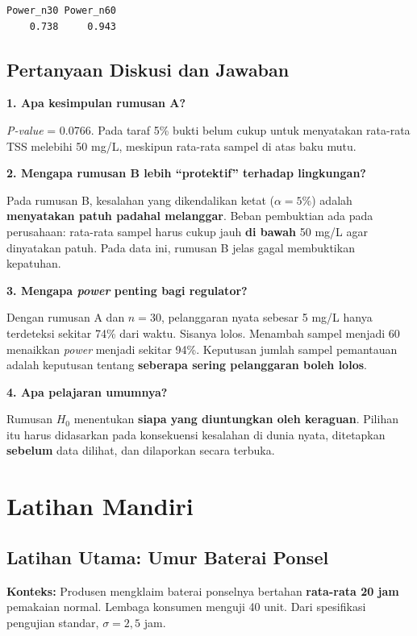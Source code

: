 \documentclass[
  indonesian,
  letterpaper,
]{book}
\begin{document}
\begin{verbatim}
Power_n30 Power_n60 
    0.738     0.943 
\end{verbatim}

\subsection{Pertanyaan Diskusi dan
Jawaban}\label{pertanyaan-diskusi-dan-jawaban-1}

\textbf{1. Apa kesimpulan rumusan A?}

\emph{P-value} = 0.0766. Pada taraf 5\% bukti belum cukup untuk
menyatakan rata-rata TSS melebihi 50 mg/L, meskipun rata-rata sampel di
atas baku mutu.

\textbf{2. Mengapa rumusan B lebih ``protektif'' terhadap lingkungan?}

Pada rumusan B, kesalahan yang dikendalikan ketat (\(\alpha = 5\%\))
adalah \textbf{menyatakan patuh padahal melanggar}. Beban pembuktian ada
pada perusahaan: rata-rata sampel harus cukup jauh \textbf{di bawah} 50
mg/L agar dinyatakan patuh. Pada data ini, rumusan B jelas gagal
membuktikan kepatuhan.

\textbf{3. Mengapa \emph{power} penting bagi regulator?}

Dengan rumusan A dan \(n = 30\), pelanggaran nyata sebesar 5 mg/L hanya
terdeteksi sekitar 74\% dari waktu. Sisanya lolos. Menambah sampel
menjadi 60 menaikkan \emph{power} menjadi sekitar 94\%. Keputusan jumlah
sampel pemantauan adalah keputusan tentang \textbf{seberapa sering
pelanggaran boleh lolos}.

\textbf{4. Apa pelajaran umumnya?}

Rumusan \(H_0\) menentukan \textbf{siapa yang diuntungkan oleh
keraguan}. Pilihan itu harus didasarkan pada konsekuensi kesalahan di
dunia nyata, ditetapkan \textbf{sebelum} data dilihat, dan dilaporkan
secara terbuka.

\section{Latihan Mandiri}\label{latihan-mandiri-1}

\subsection{Latihan Utama: Umur Baterai
Ponsel}\label{latihan-utama-umur-baterai-ponsel}

\textbf{Konteks:} Produsen mengklaim baterai ponselnya bertahan
\textbf{rata-rata 20 jam} pemakaian normal. Lembaga konsumen menguji 40
unit. Dari spesifikasi pengujian standar, \(\sigma = 2{,}5\) jam.
\end{document}
